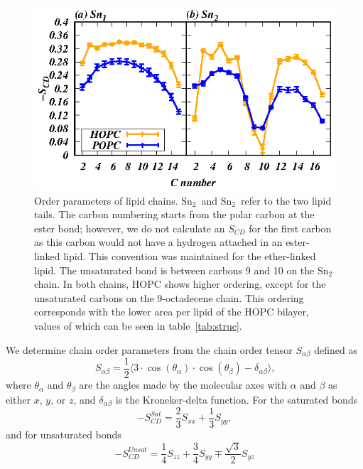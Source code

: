 \documentclass[12pt,preprint,times,openany,draft]{book}
\begin{document}
\begin{figure}[t]
\caption{ 
Order parameters of lipid chains. Sn$_2$~and Sn$_2$~refer to the two lipid tails. The carbon numbering starts from the polar carbon
at the ester bond; however, we do not calculate an $S_{CD}$ for the first carbon as this carbon would not have 
a hydrogen attached in an ester-linked lipid. 
This convention was maintained for the ether-linked lipid. The unsaturated bond is between carbons 9 and 10 on the $\text{Sn}_2$ chain.
In both chains, HOPC shows higher ordering, except for the unsaturated carbons on  the 
9-octadecene chain. This ordering corresponds with the lower area per lipid of the HOPC bilayer, values of which can be seen in table~\ref{tab:struc}. }
\label{fig:chainorder}
\includegraphics[width=	\textwidth]{chainorder.eps}
\end{figure}
We determine chain order parameters from the chain order tensor $S_{\alpha\beta}$ defined as
\begin{equation}
\label{eq:chainorder}
S_{\alpha\beta}=\frac{1}{2}\bigg \langle 3 \cdot \cos(\theta_\alpha) \cdot \cos(\theta_\beta) - \delta_{\alpha\beta}\bigg \rangle\text{,}
\end{equation}
where $\theta_\alpha$ and $\theta_\beta$ are the angles made 
by the molecular axes with $\alpha$ and $\beta$ as either $x$, $y$, or $z$, and $\delta_{\alpha\beta}$ is 
the Kroneker-delta function. For the saturated bonds~\cite{egberts:1988}
\begin{equation}
\label{eq:chainorderparam}
-S^{Sat}_{CD}=\frac{2}{3}S_{xx}+\frac{1}{3}S_{yy},
\end{equation}
and for unsaturated bonds~\cite{douliez:1995}
\begin{equation}
-S^{Unsat}_{CD}=\frac{1}{4}S_{zz}+\frac{3}{4}S_{yy}\mp \frac{\sqrt{3}}{2}S_{yz}
\label{eq:chainordunsat}
\end{equation}
\end{document}

